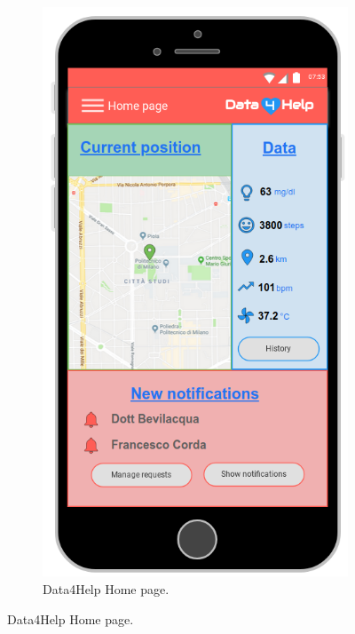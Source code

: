 \begin{figure}[ht]
\begin{subfigure}[t]{0.38\linewidth}
        \includegraphics[width=\linewidth]{images/Mockup/Home_page.png}
        \caption{Data4Help Home page.}
    \end{subfigure}
    

\end{figure}
